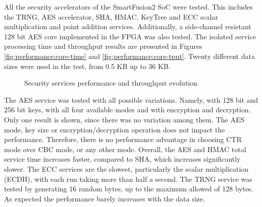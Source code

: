 All the security accelerators of the SmartFusion2 SoC were tested. This includes the TRNG, AES accelerator, SHA, HMAC, KeyTree and ECC scalar multiplication and point addition services.
Additionally, a side-channel resistant 128 bit AES core implemented in the FPGA was also tested.
The isolated service processing time and throughput results are presented in Figures \ref{fig:performance:core-time} and \ref{fig:performance:core-tput}. Twenty different data sizes were used in the test, from 0.5 KB up to 36 KB.
\begin{figure}[h!]
	\centering     %
	\caption{Security services performance and throughput evolution}
\end{figure}
The AES service was tested with all possible variations. Namely, with 128 bit and 256 bit keys, with all four available modes and with encryption and decryption. Only one result is shown, since there was no variation among them. The AES mode, key size or encryption/decryption operation does not impact the performance. Therefore, there is no performance advantage in choosing CTR mode over CBC mode, or any other mode.
Overall, the AES and HMAC total service time increases faster, compared to SHA, which increases significantly slower.
The ECC services are the slowest, particularly the scalar multiplication (ECDH), with each run taking more than half a second.
The TRNG service was tested by generating 16 random bytes, up to the maximum allowed of 128 bytes. As expected the performance barely increases with the data size.

